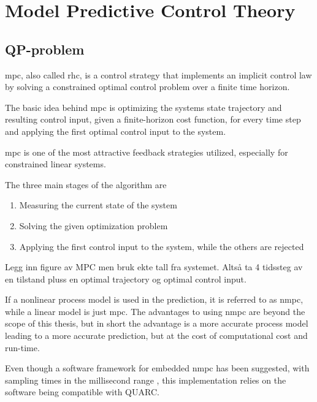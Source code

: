 




\chapter{Model Predictive Control Theory} \label{sec:MPC}



\section{QP-problem}

\acrfull{mpc}, also called \acrfull{rhc}, is a control strategy that implements an implicit control law by solving a constrained optimal control problem over a finite time horizon.

The basic idea behind \acrlong{mpc} is optimizing the systems state trajectory and resulting control input, given a finite-horizon cost function, for every time step and applying the first optimal control input to the system.

\acrshort{mpc} is one of the most attractive feedback strategies utilized, especially for constrained linear systems. 

The three main stages of the algorithm are
\begin{enumerate}
    \item Measuring the current state of the system
    \item Solving the given optimization problem
    \item Applying the first control input to the system, while the others are rejected
\end{enumerate}


Legg inn figure av MPC men bruk ekte tall fra systemet.
Altså ta 4 tidssteg av en tilstand pluss en optimal trajectory og optimal control input. 


If a nonlinear process model is used in the prediction, it is referred to as \acrfull{nmpc}, while a linear model is just \acrfull{mpc}. The advantages to using \acrlong{nmpc} are beyond the scope of this thesis, but in short the advantage is a more accurate process model leading to a more accurate prediction, but at the cost of computational cost and run-time. 

Even though a software framework for embedded \acrlong{nmpc} has been suggested, with sampling times in the millisecond range \cite{Englert2019}, this implementation relies on the software being compatible with QUARC. 

